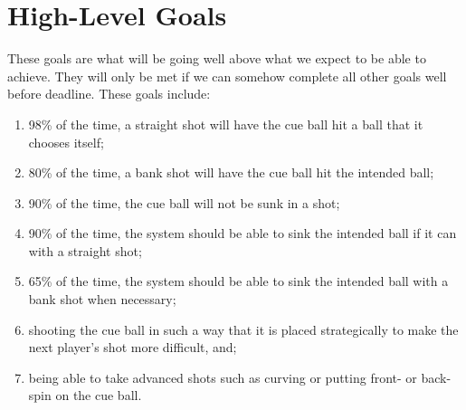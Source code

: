 \documentclass[titlepage]{article}
\begin{document}
\section{High-Level Goals}
These goals are what will be going well above what we expect to be able to achieve. They will only be met if we can somehow complete all other goals well before deadline. These goals include:
\begin{enumerate}
	\item 98\% of the time, a straight shot will have the cue ball hit a ball that it chooses itself;
	\item 80\% of the time, a bank shot will have the cue ball hit the intended ball;
	\item 90\% of the time, the cue ball will not be sunk in a shot;
	\item 90\% of the time, the system should be able to sink the intended ball if it can with a straight shot;
	\item 65\% of the time, the system should be able to sink the intended ball with a bank shot when necessary;
	\item shooting the cue ball in such a way that it is placed strategically to make the next player's shot more difficult, and;
	\item being able to take advanced shots such as curving or putting front- or back-spin on the cue ball.
\end{enumerate}

\end{document}
